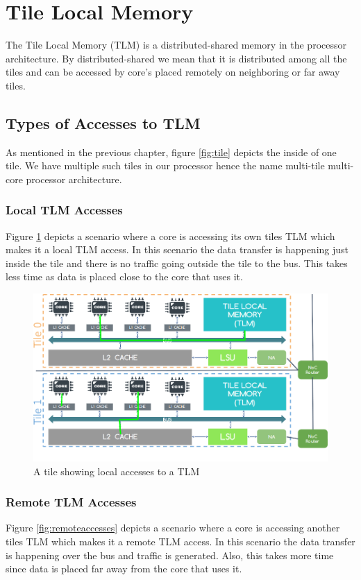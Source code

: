 \documentclass{listhesis}
\begin{document}
\section{Tile Local Memory}
The Tile Local Memory (TLM) is a distributed-shared memory in the processor architecture. By distributed-shared we mean that it is distributed among all the tiles and can be accessed by core's placed remotely on neighboring or far away tiles. 
\subsection{Types of Accesses to TLM}
As mentioned in the previous chapter, figure \ref{fig:tile} depicts the inside of one tile. We have multiple such tiles in our processor hence the name multi-tile multi-core processor architecture.
\subsubsection{Local TLM Accesses}
Figure \ref{fig:localaccesses} depicts a scenario where a core is accessing its own tiles TLM which makes it a local TLM access. In this scenario the data transfer is happening just inside the tile and there is no traffic going outside the tile to the bus. This takes less time as data is placed close to the core that uses it. 

\begin{figure}
  \includegraphics[width=\linewidth]{localaccesses.png}
  \centering
  \caption{A tile showing local accesses to a TLM}
  \label{fig:localaccesses}
\end{figure}
\subsubsection{Remote TLM Accesses}
Figure \ref{fig:remoteaccesses} depicts a scenario where a core is accessing another tiles TLM which makes it a remote TLM access. In this scenario the data transfer is happening over the bus and traffic is generated. Also, this takes more time since data is placed far away from the core that uses it. 
\end{document}
